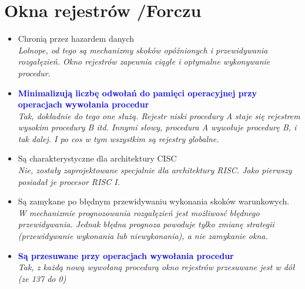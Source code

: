 \section{Okna rejestrów {\small /Forczu}}
	\begin{itemize}
    \item Chronią przez hazardem danych\\
    {\small \emph{Lolnope, od tego są mechanizmy skoków opóźnionych i przewidywania rozgałęzień. Okno rejestrów zapewnia ciągłe i optymalne wykonywanie procedur.}}
    \item \textcolor{Blue}{\textbf{Minimalizują liczbę odwołań do pamięci operacyjnej przy operacjach wywołania procedur}}\\
    {\small \emph{Tak, dokładnie do tego one służą. Rejestr niski procedury A staje się rejestrem wysokim procedury B itd. Innymi słowy, procedura A wywołuje procedurę B, i tak dalej. I po cos w tym wszystkim są rejestry globalne.}}
    \item Są charakterystyczne dla architektury CISC\\
    {\small \emph{Nie, zostały zaprojektowane specjalnie dla architektury RISC. Jako pierwszy posiadał je procesor RISC I.}}
    \item Są zamykane po błędnym przewidywaniu wykonania skoków warunkowych.\\
    {\small \emph{W mechanizmie prognozowania rozgałęzień jest możliwosć błędnego przewidywania. Jednak błędna prognoza powoduje tylko zmianę strategii (przewidywanie wykonania lub niewykonania), a nie zamykanie okna.}}
    \item \textcolor{Blue}{\textbf{Są przesuwane przy operacjach wywołania procedur}}\\
    {\small \emph{Tak, z każdą nową wywołaną procedurą okno rejestrów przesuwane jest w dół (ze 137 do 0)}}
    \end{itemize}

